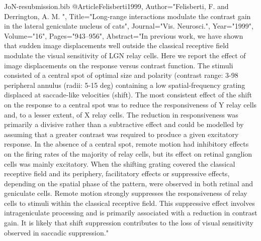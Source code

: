 \documentclass{article}
\begin{document}
\begin{filecontents}{JoN-resubmission.bib}
@Article{Felisberti1999,
   Author="Felisberti, F.  and Derrington, A. M. ",
   Title="{{L}ong-range interactions modulate the contrast gain in the lateral geniculate nucleus of cats}",
   Journal="Vis. Neurosci.",
   Year="1999",
   Volume="16",
   Pages="943--956",
   Abstract="In previous work, we have shown that sudden image
displacements well outside the classical receptive field modulate the
visual sensitivity of LGN relay cells. Here we report the effect of
image displacements on the response versus contrast function. The
stimuli consisted of a central spot of optimal size and polarity
(contrast range: 3-98%
peripheral annulus (radii: 5-15 deg) containing a low
spatial-frequency grating displaced at saccade-like velocities
(shift). The most consistent effect of the shift on the response to a
central spot was to reduce the responsiveness of Y relay cells and, to
a lesser extent, of X relay cells. The reduction in responsiveness was
primarily a divisive rather than a subtractive effect and could be
modelled by assuming that a greater contrast was required to produce a
given excitatory response. In the absence of a central spot, remote
motion had inhibitory effects on the firing rates of the majority of
relay cells, but its effect on retinal ganglion cells was mainly
excitatory. When the shifting grating covered the classical receptive
field and its periphery, facilitatory effects or suppressive effects,
depending on the spatial phase of the pattern, were observed in both
retinal and geniculate cells. Remote motion strongly suppresses the
responsiveness of relay cells to stimuli within the classical
receptive field. This suppressive effect involves intrageniculate
processing and is primarily associated with a reduction in contrast
gain. It is likely that shift suppression contributes to the loss of
visual sensitivity observed in saccadic suppression."  }


\end{filecontents}
\end{document}
